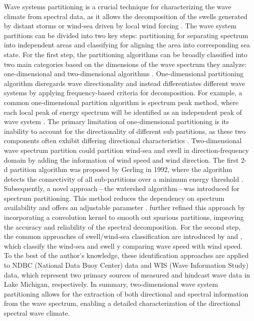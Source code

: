 Wave systems partitioning is a crucial technique for characterizing the wave
climate from spectral data, as it allows the decomposition of the swells
generated by distant storms or wind-sea driven by local wind forcing
\citep{jiang_wave_2019,portilla-yandun_wave_2015}. The wave system partitions
can be divided into two key steps: partitioning for separating spectrum into
independent areas and classifying for aligning the area into corresponding sea
state. For the first step, the partitioning algorithms can be broadly classified
into two main categories based on the dimensions of the wave spectrum they
analyze: one-dimensional and two-dimensional algorithms
\citep{portilla_spectral_2009}.  One-dimensional partitioning algorithm
disregards wave directionality and instead differentiates different wave systems
by applying frequency-based criteria for decomposition. For example, a common
one-dimensional partition algorithm is spectrum peak method, where each local
peak of energy spectrum will be identified as an independent peak of wave system
\citep{portilla_spectral_2009,violante-carvalho_growth_2001,voorrips_assimilation_1997}.
The primary limitation of one-dimensional partitioning is its inability to
account for the directionality of different sub partitions, as these two
components often exhibit differing directional characteristics
\citep{george_nearshore_2020}.  Two-dimensional wave spectrum partition could
partition wind-sea and swell in direction-frequency domain by adding the
information of wind speed and wind direction. The first 2-d partition algorithm
was proposed by Gerling in 1992, where the algorithm detects the connectivity of
all sub-partitions over a minimum energy threshold
\citep{gerling_partitioning_1992}. Subsequently, a novel approach—the watershed
algorithm—was introduced for spectrum partitioning. This method reduces the
dependency on spectrum availability \citep{hasselmann_improved_1996} and offers
an adjustable parameter \citep{hanson_automated_2001}.
\citet{portilla_spectral_2009} further refined this approach by incorporating a
convolution kernel to smooth out spurious partitions, improving the accuracy and
reliability of the spectral decomposition. For the second step, the common
approaches of swell/wind-sea classification are introduced by
\citet{komen_existence_1984} and \citet{jensen_lake_2012}, which classify the
wind-sea and swell y comparing wave speed with wind speed. To the best of the
author's knowledge, these identification approaches are applied to NDBC
(National Data Buoy Center) data and WIS (Wave Information Study) data, which
represent two primary sources of measured and hindcast wave data in Lake
Michigan, respectively. In summary, two-dimensional wave system partitioning
allows for the extraction of both directional and spectral information from the
wave spectrum, enabling a detailed characterization of the directional spectral
wave climate.

